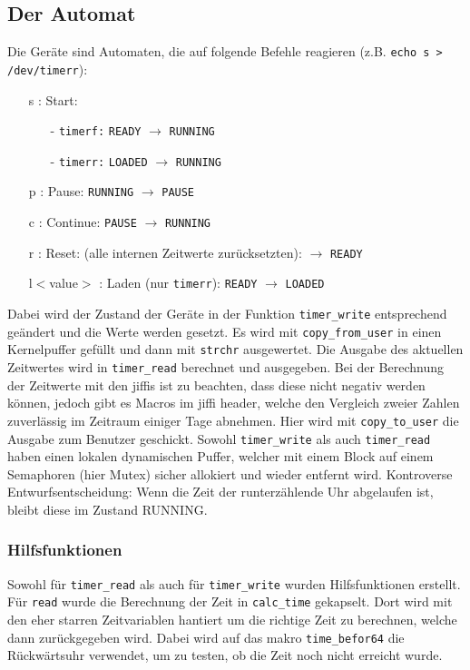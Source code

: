 \documentclass[
   draft=false
  ,paper=a4
  ,twoside=false
  ,fontsize=11pt
  ,headsepline
  ,BCOR10mm
  ,DIV11
  ,parskip=full+
]{scrartcl} %
\begin{document}
\subsection{Der Automat}
Die Geräte sind Automaten, die auf folgende Befehle reagieren
(z.B. \texttt{echo s > /dev/timerr}):
\begin{enumerate}
    \item[s :] Start:
        \begin{enumerate}
            \item[-] \texttt{timerf:} \texttt{READY}  $\to$ \texttt{RUNNING}
            \item[-] \texttt{timerr:} \texttt{LOADED} $\to$ \texttt{RUNNING}
        \end{enumerate}
    \item[p :] Pause: \texttt{RUNNING} $\to$ \texttt{PAUSE}
    \item[c :] Continue: \texttt{PAUSE} $\to$ \texttt{RUNNING}
    \item[r :] Reset: (alle internen Zeitwerte zurücksetzten):
        $\to$ \texttt{READY}
    \item[l$<$value$>$ :] Laden (nur \texttt{timerr}):
        \texttt{READY} $\to$ \texttt{LOADED}
\end{enumerate}
Dabei wird der Zustand der Geräte in der Funktion \texttt{timer\_write}
entsprechend geändert und die Werte werden gesetzt. Es wird mit
 \texttt{copy\_from\_user} in einen Kernelpuffer
gefüllt und dann mit \texttt{strchr}
ausgewertet.
Die Ausgabe des aktuellen Zeitwertes wird in \texttt{timer\_read} berechnet
und ausgegeben. Bei der Berechnung der Zeitwerte mit den jiffis ist zu
beachten, dass diese nicht negativ werden können, jedoch gibt es Macros im
jiffi header, welche den Vergleich zweier Zahlen zuverlässig im Zeitraum
einiger Tage abnehmen. Hier wird mit
\texttt{copy\_to\_user} die Ausgabe zum Benutzer geschickt. Sowohl
\texttt{timer\_write} als auch \texttt{timer\_read} haben einen lokalen
dynamischen Puffer, welcher mit einem Block auf einem Semaphoren (hier Mutex)
sicher allokiert und wieder entfernt wird.
Kontroverse Entwurfsentscheidung:
Wenn die Zeit der runterzählende Uhr abgelaufen ist, bleibt diese im Zustand 
RUNNING. 

\subsubsection{Hilfsfunktionen}
Sowohl für \texttt{timer\_read} als auch für \texttt{timer\_write} wurden
Hilfsfunktionen erstellt. Für \texttt{read} wurde die Berechnung der Zeit in
\texttt{calc\_time} gekapselt. Dort wird mit den eher starren Zeitvariablen
hantiert um die richtige Zeit zu berechnen, welche dann zurückgegeben wird.
Dabei wird auf das makro \texttt{time\_befor64} die Rückwärtsuhr verwendet,
um zu testen, ob die Zeit noch nicht erreicht wurde.
\end{document}
